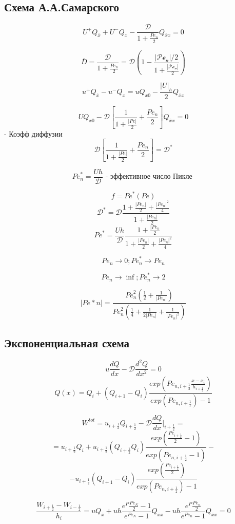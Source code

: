 \documentclass[12pt, a4paper]{article}
\begin{document}
\subsection{Схема А.А.Самарского}

\[ U^+Q_{\overline{x}} + U^- Q_x - \frac{\mathcal{D }}{1 + \frac{{Pe}_n }{2}} Q_{\overline{x}x} = 0 \]

\[ \overline{D} = \frac{\mathcal{D }}{1 + \frac{{Pe}_n}{2}} = \mathcal{D(1- \frac{|{Pe}_n| /2}{1+\frac{|{Pe}_n| }{2}})} \]

\[ u^+ Q_{\overline{x}} - u^-Q_x = u Q_{x0} - \frac{|U|_h}{2}Q_{\overline{x} x}\]

\[ U Q_{x0} - \mathcal{D} [\frac{1}{1+\frac{|Pe|}{2}}+\frac{{Pe}_n }{2}]Q_{\overline{x}x} = 0 \]
- Коэфф диффузии 
\[ \mathcal{D} [\frac{1}{1+\frac{|Pe|}{2}}+\frac{{Pe}_n }{2}] = \mathcal{D}^* \]

\[ {Pe}^*_n = \frac{Uh }{\mathcal{D }} \textrm{ - эффективное число Пикле } \]

\[ f = {Pe}^*({Pe}) \]
\[ \mathcal{D}^* = \mathcal{D} \frac{1+\frac{|{Pe}_n|}{2}+\frac{|{Pe}_n|^2}{4}}{1+\frac{|{Pe}_n|}{2}} \]
\[ {Pe}^* = \frac{Uh }{\mathcal{D}} \frac{1+\frac{|{Pe}_n }{2}}{1+\frac{|{Pe}_n|}{2}+\frac{|{Pe}_n|^2}{4}} \]

\[ {Pe}_n \rightarrow 0; {Pe}^*_n \rightarrow {Pe}_n  \]

\[ {Pe}_n \rightarrow \inf; {Pe}^*_n \rightarrow 2 \]

\[ |{Pe}*n| = \frac{{Pe}^2_n (\frac{1}{2} + \frac{1}{|{Pe}_n|})}{{Pe}^2_n (\frac{1}{4}+\frac{1}{2|{Pe}_n|}+\frac{1}{|{Pe}_n|^2})} \]

\subsection{Экспоненциальная схема}

\[ u \frac{dQ }{dx} - \mathcal{D} \frac{d^2Q }{dx^2} = 0 \]
\[ Q(x) = Q_i + {(Q_{i+1} - Q_i)}\frac{{exp({Pe}_{n, i+ \frac{1}{2}}\frac{x-x_i }{h_{i+\frac{1}{2}}})}}{exp({Pe}_{n, i+\frac{1}{2}})-1} \]

\[ W^{tot} = u_{i+\frac{1}{2}} Q_{i+\frac{1}{2}} - \mathcal{D} \frac{dQ}{dx}|_{i+\frac{1}{2}} = \]
\[ = u_{i+\frac{1}{2}} Q_i + u_{i+\frac{1}{2}}(Q_{i+\frac{1}{2}} Q_i) \frac{exp(\frac{{Pe}_{i+\frac{1}{2}}}{2}-1)}{exp({Pe_{n, i+\frac{1}{2}}}-1)} - \]
\[ - u_{i+\frac{1}{2}}(Q_{i+1}-Q_i) \frac{exp(\frac{{Pe}_{i+\frac{1}{2}}}{2})}{exp({Pe_{n, i+\frac{1}{2}}})-1} \]

\[ \frac{W_{i+\frac{1}{2}} - W_{i-\frac{1}{2}}}{h_i} = u Q_{\overline{x}} + u h \frac{e^P \frac{{Pe}_N}{2}-1}{e^{{Pe}_N}-1} Q_{\overline{x}x} - u h \frac{e^P \frac{{Pe}_n}{2}}{e^{{Pe}_n}-1} Q_{\overline{x}x} = 0 \]
\end{document}
